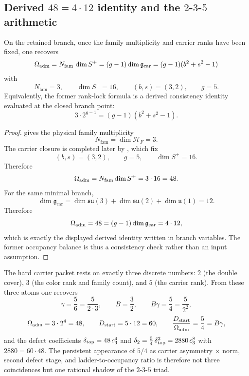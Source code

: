 \subsection{Derived \texorpdfstring{$48=4\cdot12$}{48=4·12} identity and the \texorpdfstring{$2$-$3$-$5$}{2-3-5} arithmetic}

\begin{proposition}[Derived \texorpdfstring{$48=4\cdot12$}{48=4·12} identity on the retained branch]
\label{prop:rank-lock}
On the retained branch, once the family multiplicity and carrier ranks have been fixed, one
recovers
\[
\Omega_{\mathrm{adm}}
=
N_{\mathrm{fam}}\,\dim S^+
=
(g-1)\dim\mathfrak g_{\mathrm{car}}
=
(g-1)(b^2+s^2-1)
\]
with
\[
N_{\mathrm{fam}}=3,
\qquad
\dim S^+=16,
\qquad
(b,s)=(3,2),
\qquad
g=5.
\]
Equivalently, the former rank-lock formula is a derived consistency identity evaluated at the
closed branch point:
\begin{equation}
\label{eq:rank-lock}
3\cdot 2^{g-1}=(g-1)(b^2+s^2-1).
\end{equation}
\end{proposition}

\begin{proof}
 gives the physical family multiplicity
\[
N_{\mathrm{fam}}=\dim\mathcal H_F=3.
\]
The carrier closure is completed later by , which
fix
\[
(b,s)=(3,2),
\qquad
g=5,
\qquad
\dim S^+=16.
\]
Therefore
\[
\Omega_{\mathrm{adm}}=N_{\mathrm{fam}}\dim S^+=3\cdot16=48.
\]
For the same minimal branch,
\[
\dim\mathfrak g_{\mathrm{car}}
=
\dim\mathfrak{su}(3)+\dim\mathfrak{su}(2)+\dim\mathfrak u(1)
=
12.
\]
Therefore
\[
\Omega_{\mathrm{adm}}=48=(g-1)\dim\mathfrak g_{\mathrm{car}}=4\cdot 12,
\]
which is exactly the displayed derived identity written in branch variables. The former occupancy
balance is thus a consistency check rather than an input assumption.
\end{proof}

\begin{remark}
The hard carrier packet rests on exactly three discrete numbers: $2$ (the double cover), $3$ (the color rank and family count), and $5$ (the carrier rank). From these three atoms one recovers
\[
\gamma=\frac{5}{6}=\frac{5}{2\cdot 3},
\qquad
B=\frac{3}{2},
\qquad
B\gamma=\frac{5}{4}=\frac{5}{2^2},
\]
\[
\Omega_{\mathrm{adm}}=3\cdot 2^4=48,
\qquad
D_{\mathrm{start}}=5\cdot 12=60,
\qquad
\frac{D_{\mathrm{start}}}{\Omega_{\mathrm{adm}}}=\frac{5}{4}=B\gamma,
\]
and the defect coefficients $\delta_{\mathrm{top}}=48\,c_3^4$ and $\delta_2=\frac54\,\delta_{\mathrm{top}}^2=2880\,c_3^8$ with $2880=60\cdot 48$.
The persistent appearance of $5/4$ as carrier asymmetry $\times$ norm, second defect stage, and ladder-to-occupancy ratio is therefore not three coincidences but one rational shadow of the $2$-$3$-$5$ triad.
\end{remark}

